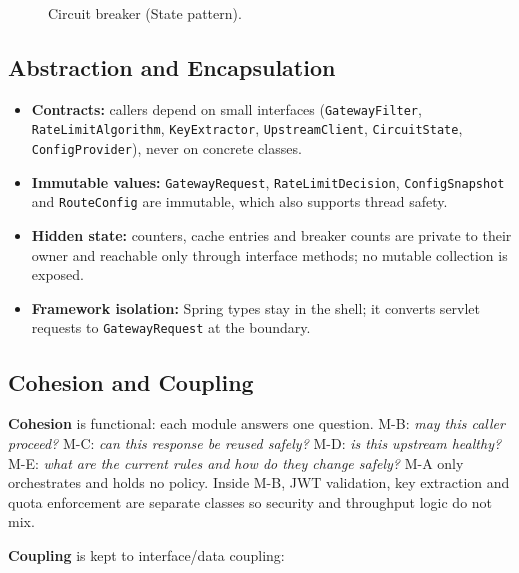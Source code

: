 \documentclass[12pt,a4paper]{article}
\newcommand{\cls}[1]{\nolinkurl{#1}}
\begin{document}
\begin{figure}[H]
{}
\caption{Circuit breaker (State pattern).}
\end{figure}

\subsection{Abstraction and Encapsulation}
\begin{itemize}[noitemsep]
    \item \textbf{Contracts:} callers depend on small interfaces (\cls{GatewayFilter}, \cls{RateLimitAlgorithm}, \cls{KeyExtractor}, \cls{UpstreamClient}, \cls{CircuitState}, \cls{ConfigProvider}), never on concrete classes.
    \item \textbf{Immutable values:} \cls{GatewayRequest}, \cls{RateLimitDecision}, \cls{ConfigSnapshot} and \cls{RouteConfig} are immutable, which also supports thread safety.
    \item \textbf{Hidden state:} counters, cache entries and breaker counts are private to their owner and reachable only through interface methods; no mutable collection is exposed.
    \item \textbf{Framework isolation:} Spring types stay in the shell; it converts servlet requests to \cls{GatewayRequest} at the boundary.
\end{itemize}

\subsection{Cohesion and Coupling}
\textbf{Cohesion} is functional: each module answers one question. M-B: \emph{may this caller proceed?} M-C: \emph{can this response be reused safely?} M-D: \emph{is this upstream healthy?} M-E: \emph{what are the current rules and how do they change safely?} M-A only orchestrates and holds no policy. Inside M-B, JWT validation, key extraction and quota enforcement are separate classes so security and throughput logic do not mix.

\textbf{Coupling} is kept to interface/data coupling:
\end{document}
